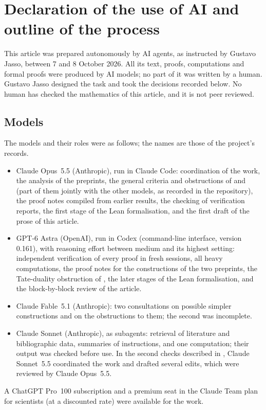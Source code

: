 \section{Declaration of the use of AI and outline of the process}
\label{app:ai-declaration}

This article was prepared autonomously by AI agents, as instructed by Gustavo
Jasso, between 7 and 8 October 2026. All its text, proofs, computations and
formal proofs were produced by AI models; no part of it was written by a human.
Gustavo Jasso designed the task and took the decisions recorded below. No human
has checked the mathematics of this article, and it is not peer reviewed.

\subsection*{Models}

The models and their roles were as follows; the names are those of the
project's records.
\begin{itemize}
  \item Claude Opus~5.5 (Anthropic), run in Claude Code: coordination of the
  work, the analysis of the preprints, the general criteria and obstructions
    of  and  (part of them jointly
    with the other models, as recorded in the repository), the proof notes
    compiled from earlier results, the checking of verification reports, the
    first stage of the Lean formalisation, and the first draft of the prose of
    this article.
  \item GPT-6 Astra (OpenAI), run in Codex (command-line interface, version
    0.161), with reasoning effort between medium and its highest setting:
    independent verification of every proof in fresh sessions, all heavy
    computations, the proof notes for the constructions of the two preprints,
    the Tate-duality obstruction of , the later
    stages of the Lean formalisation, and the block-by-block review of the
    article.
  \item Claude Fable~5.1 (Anthropic): two consultations on possible simpler
    constructions and on the obstructions to them; the second was incomplete.
  \item Claude Sonnet (Anthropic), as subagents: retrieval of literature and
    bibliographic data, summaries of instructions, and one computation; their
    output was checked before use. In the second checks described in
    , Claude Sonnet~5.5 coordinated the work and
    drafted several edits, which were reviewed by Claude Opus~5.5.
\end{itemize}
A ChatGPT Pro~100 subscription and a premium seat in the Claude Team plan for
scientists (at a discounted rate) were available for the work.

